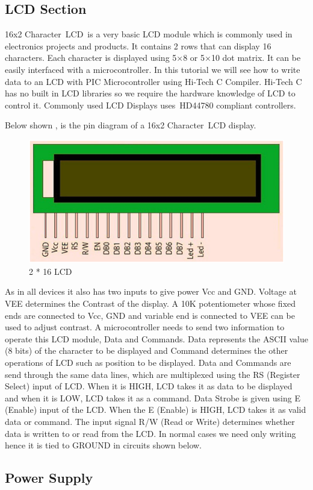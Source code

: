 \documentclass[12pt,a4paper,oneside,openright]{report}
\begin{document}
\subsection{LCD Section}
16x2 Character LCD is a very basic LCD module which is commonly used in electronics projects and products. It contains 2 rows that can display 16 characters. Each character is displayed using 5×8 or 5×10 dot matrix. It can be easily interfaced with a microcontroller. In this tutorial we will see how to write data to an LCD with PIC Microcontroller using Hi-Tech C Compiler. Hi-Tech C has no built in LCD libraries so we require the hardware knowledge of LCD to control it. Commonly used LCD Displays uses HD44780 compliant controllers.

Below shown , is the pin diagram of a 16x2 Character LCD display. 
\begin{figure}[!h]
 \centering
 \includegraphics[width = .70\textwidth]{Figures/7.jpg}
 \caption{2 * 16 LCD}
 \label{lcd}
\end{figure}
As in all devices it also has two inputs to give power Vcc and GND. Voltage at VEE determines the Contrast of the display. A 10K potentiometer whose fixed ends are connected to Vcc, GND and variable end is connected to VEE can be used to adjust contrast. A microcontroller needs to send two information to operate this LCD module, Data and Commands. Data represents the ASCII value (8 bits) of the character to be displayed and Command determines the other operations of LCD such as position to be displayed. Data and Commands are send through the same data lines, which are multiplexed using the RS (Register Select) input of LCD. When it is HIGH, LCD takes it as data to be displayed and when it is LOW, LCD takes it as a command. Data Strobe is given using E (Enable) input of the LCD. When the E (Enable) is HIGH, LCD takes it as valid data or command. The input signal R/W (Read or Write) determines whether data is written to or read from the LCD. In normal cases we need only writing hence it is tied to GROUND in circuits shown below.

\subsection{Power Supply}
\end{document}
